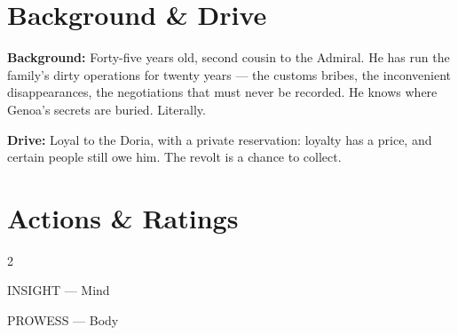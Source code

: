 \clearpage



\section*{Background \& Drive}

\begin{rulebox}{}
  \textbf{Background:} Forty-five years old, second cousin to the Admiral. He has
  run the family's dirty operations for twenty years --- the customs bribes, the
  inconvenient disappearances, the negotiations that must never be recorded.
  He knows where Genoa's secrets are buried. Literally.

  \medskip\noindent\textcolor{DoriaBlue}{\textbf{Drive:}} Loyal to the Doria, with
  a private reservation: loyalty has a price, and certain people still owe him.
  The revolt is a chance to collect.
\end{rulebox}

\section*{Actions \& Ratings}

\begin{multicols}{2}
\begin{attributoblock}[DoriaBlue]{INSIGHT --- Mind}
\end{attributoblock}
\begin{attributoblock}[DoriaBlue]{PROWESS --- Body}
\end{attributoblock}
\end{multicols}

